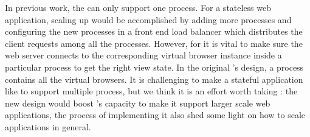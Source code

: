In previous work, the \cb{} can only support one process.
For a stateless web application,
scaling up would be accomplished by adding more processes and configuring the new processes
in a front end load balancer which distributes the client requests among all the processes.
However, for \cb{} it is vital to make sure the web server connects to the corresponding
virtual browser instance inside a particular process to get the right view state.
In the original \cb{}'s design, a \cb{} process contains all the virtual browsers.%
It is challenging to make a stateful application like \cb{} to support multiple process, 
but we think it is an effort worth taking :
the new design would boost \cb{}'s capacity to make it support larger scale web applications,
the process of implementing it also shed some light on how to scale \nodejs{} applications in general.



\architectureoverview{} 

